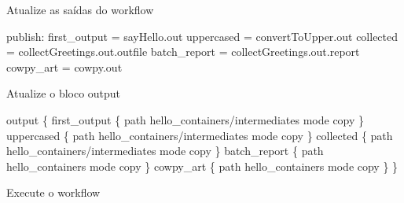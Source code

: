 \documentclass[
  brazilian,
  letterpaper,
  DIV=11,
  numbers=noendperiod]{scrreprt}
\newenvironment{Shaded}{\begin{snugshade}}{\end{snugshade}}
\newcommand{\NormalTok}[1]{\textcolor[rgb]{0.00,0.23,0.31}{#1}}
\newcommand{\OperatorTok}[1]{\textcolor[rgb]{0.37,0.37,0.37}{#1}}
\newcommand{\StringTok}[1]{\textcolor[rgb]{0.13,0.47,0.30}{#1}}
\begin{document}
\begin{tcolorbox}
Atualize as saídas do workflow

\begin{Shaded}
\begin{Highlighting}[]

\NormalTok{    publish}\OperatorTok{:}
\NormalTok{    first\_output }\OperatorTok{=}\NormalTok{ sayHello}\OperatorTok{.}\NormalTok{out}
\NormalTok{    uppercased }\OperatorTok{=}\NormalTok{ convertToUpper}\OperatorTok{.}\NormalTok{out}
\NormalTok{    collected }\OperatorTok{=}\NormalTok{ collectGreetings}\OperatorTok{.}\NormalTok{out}\OperatorTok{.}\NormalTok{outfile}
\NormalTok{    batch\_report }\OperatorTok{=}\NormalTok{ collectGreetings}\OperatorTok{.}\NormalTok{out}\OperatorTok{.}\NormalTok{report}
\NormalTok{    cowpy\_art }\OperatorTok{=}\NormalTok{ cowpy}\OperatorTok{.}\NormalTok{out}
\end{Highlighting}
\end{Shaded}

Atualize o bloco output

\begin{Shaded}
\begin{Highlighting}[]
\NormalTok{output }\OperatorTok{\{}
\NormalTok{    first\_output }\OperatorTok{\{}
\NormalTok{        path }\StringTok{\textquotesingle{}hello\_containers/intermediates\textquotesingle{}}
\NormalTok{        mode }\StringTok{\textquotesingle{}copy\textquotesingle{}}
    \OperatorTok{\}}
\NormalTok{    uppercased }\OperatorTok{\{}
\NormalTok{        path }\StringTok{\textquotesingle{}hello\_containers/intermediates\textquotesingle{}}
\NormalTok{        mode }\StringTok{\textquotesingle{}copy\textquotesingle{}}
    \OperatorTok{\}}
\NormalTok{    collected }\OperatorTok{\{}
\NormalTok{        path }\StringTok{\textquotesingle{}hello\_containers/intermediates\textquotesingle{}}
\NormalTok{        mode }\StringTok{\textquotesingle{}copy\textquotesingle{}}
    \OperatorTok{\}}
\NormalTok{    batch\_report }\OperatorTok{\{}
\NormalTok{        path }\StringTok{\textquotesingle{}hello\_containers\textquotesingle{}}
\NormalTok{        mode }\StringTok{\textquotesingle{}copy\textquotesingle{}}
    \OperatorTok{\}}
\NormalTok{    cowpy\_art }\OperatorTok{\{}
\NormalTok{        path }\StringTok{\textquotesingle{}hello\_containers\textquotesingle{}}
\NormalTok{        mode }\StringTok{\textquotesingle{}copy\textquotesingle{}}
    \OperatorTok{\}}
\OperatorTok{\}}
\end{Highlighting}
\end{Shaded}

Execute o workflow


\end{tcolorbox}
\end{document}
